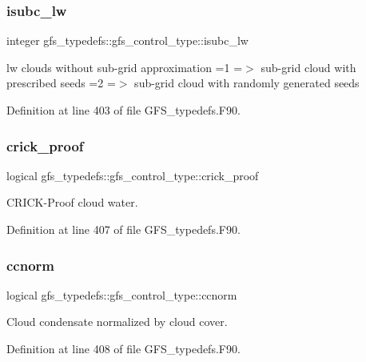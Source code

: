 \subsubsection{isubc\+\_\+lw}
{\footnotesize\ttfamily integer gfs\+\_\+typedefs\+::gfs\+\_\+control\+\_\+type\+::isubc\+\_\+lw}



lw clouds without sub-\/grid approximation =1 =$>$ sub-\/grid cloud with prescribed seeds =2 =$>$ sub-\/grid cloud with randomly generated seeds 



Definition at line 403 of file G\+F\+S\+\_\+typedefs.\+F90.

\mbox{\label{structgfs__typedefs_1_1gfs__control__type_a4ca0ffc759fe1394cae1bd5919b9f4db}} 
\subsubsection{crick\+\_\+proof}
{\footnotesize\ttfamily logical gfs\+\_\+typedefs\+::gfs\+\_\+control\+\_\+type\+::crick\+\_\+proof}



C\+R\+I\+C\+K-\/\+Proof cloud water. 



Definition at line 407 of file G\+F\+S\+\_\+typedefs.\+F90.

\mbox{\label{structgfs__typedefs_1_1gfs__control__type_abf263936f4c1e6f3a086eab9c4053698}} 
\subsubsection{ccnorm}
{\footnotesize\ttfamily logical gfs\+\_\+typedefs\+::gfs\+\_\+control\+\_\+type\+::ccnorm}



Cloud condensate normalized by cloud cover. 



Definition at line 408 of file G\+F\+S\+\_\+typedefs.\+F90.

\mbox{\label{structgfs__typedefs_1_1gfs__control__type_a1a02325fb8ea4c9e0685037d1f8b38c6}} 
